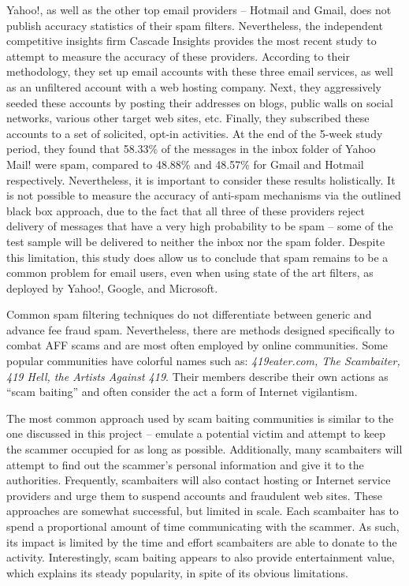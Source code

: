 Yahoo!, as well as the other top email providers -- Hotmail and Gmail, does not publish accuracy statistics of their spam filters. Nevertheless, the independent competitive insights firm Cascade Insights provides the most recent study to attempt to measure the accuracy of these providers. According to their methodology, they set up email accounts with these three email services, as well as an unfiltered account with a web hosting company. Next, they aggressively seeded these accounts by posting their addresses on blogs, public walls on social networks, various other target web sites, etc. Finally, they subscribed these accounts to a set of solicited, opt-in activities. At the end of the 5-week study period, they found that 58.33\% of the messages in the inbox folder of Yahoo Mail! were spam, compared to 48.88\% and 48.57\% for Gmail and Hotmail respectively. Nevertheless, it is important to consider these results holistically. It is not possible to measure the accuracy of anti-spam mechanisms via the outlined black box approach, due to the fact that all three of these providers reject delivery of messages that have a very high probability to be spam -- some of the test sample will be delivered to neither the inbox nor the spam folder. Despite this limitation, this study does allow us to conclude that spam remains to be a common problem for email users, even when using state of the art filters, as deployed by Yahoo!, Google, and Microsoft.

Common spam filtering techniques do not differentiate between generic and advance fee fraud spam. Nevertheless, there are methods designed specifically to combat AFF scams and are most often employed by online communities. Some popular communities have colorful names such as: \textit{419eater.com, The Scambaiter, 419 Hell, the Artists Against 419}. Their members describe their own actions as ``scam baiting'' and often consider the act a form of Internet vigilantism. 

The most common approach used by scam baiting communities is similar to the one discussed in this project -- emulate a potential victim and attempt to keep the scammer occupied for as long as possible. Additionally, many scambaiters will attempt to find out the scammer's personal information and give it to the authorities. Frequently, scambaiters will also contact hosting or Internet service providers and urge them to suspend accounts and fraudulent web sites. These approaches are somewhat successful, but limited in scale. Each scambaiter has to spend a proportional amount of time communicating with the scammer. As such, its impact is limited by the time and effort scambaiters are able to donate to the activity. Interestingly, scam baiting appears to also provide entertainment value, which explains its steady popularity, in spite of its obvious limitations.

